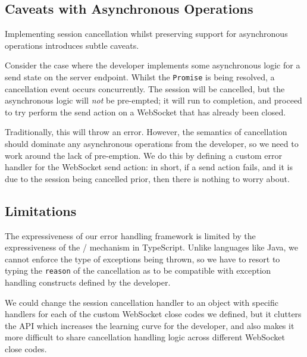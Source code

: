 \subsection{Caveats with Asynchronous Operations}
Implementing session cancellation whilst
preserving support for asynchronous operations introduces
subtle caveats. 

Consider the case where the developer implements
some asynchronous logic for a send state on the server endpoint. 
Whilst the \texttt{Promise} is being resolved, a cancellation
event occurs concurrently. The session will be cancelled, but
the asynchronous logic will \textit{not} be pre-empted; it
will run to completion, and proceed to try perform the send
action on a WebSocket that has already been closed.

Traditionally, this will throw an error. However,
the semantics of cancellation should dominate any asynchronous
operations from the developer, so we need to work around
the lack of pre-emption. We do this by defining a custom
error handler for the WebSocket send action: in short,
if a send action fails, and it is due to the session
being cancelled prior, then there is nothing to worry about.


\subsection{Limitations}
\label{subsection:errorlimit}

The expressiveness of our error handling framework is
limited by the expressiveness of the 
 /  mechanism
in TypeScript.
Unlike languages like Java, we cannot enforce the type
of exceptions being thrown, so we have to resort to
typing the \texttt{reason} of the cancellation as 
 to be compatible with 
exception handling constructs defined by the developer.

We could change the session cancellation handler
to an object with specific handlers for each of the
custom WebSocket close codes we defined, but it
clutters the API which increases the learning
curve for the developer, and also makes it
more difficult to share cancellation handling logic
across different WebSocket close codes.